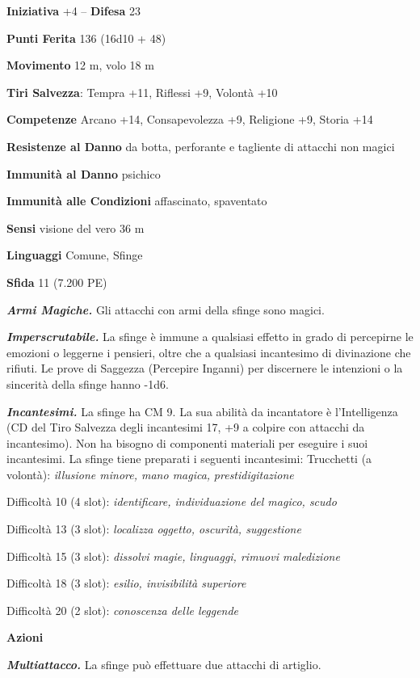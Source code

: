 \begin{multicols}{2}
\textbf{Iniziativa} +4 -- \textbf{Difesa} 23

\textbf{Punti Ferita} 136 (16d10 + 48)

\textbf{Movimento} 12 m, volo 18 m

\textbf{Tiri Salvezza}: Tempra +11, Riflessi +9, Volontà +10

\textbf{Competenze} Arcano +14, Consapevolezza +9, Religione +9, Storia +14

\textbf{Resistenze al Danno} da botta, perforante e tagliente di attacchi non magici

\textbf{Immunità al Danno} psichico

\textbf{Immunità alle Condizioni} affascinato, spaventato 

\textbf{Sensi} visione del vero 36 m

\textbf{Linguaggi} Comune, Sfinge

\textbf{Sfida} 11 (7.200 PE)

\emph{\textbf{Armi Magiche.}} Gli attacchi con armi della sfinge sono magici.

\emph{\textbf{Imperscrutabile.}} La sfinge è immune a qualsiasi effetto in grado di percepirne le emozioni o leggerne i pensieri, oltre che a qualsiasi incantesimo di divinazione che rifiuti. Le prove di Saggezza (Percepire Inganni) per discernere le intenzioni o la sincerità della sfinge hanno -1d6.

\emph{\textbf{Incantesimi.}} La sfinge ha CM 9. La sua abilità da incantatore è l'Intelligenza (CD del Tiro Salvezza degli incantesimi 17, +9 a colpire con attacchi da incantesimo). Non ha bisogno di componenti materiali per eseguire i suoi incantesimi. La sfinge tiene preparati i seguenti incantesimi: Trucchetti (a volontà): \emph{illusione minore, mano magica,} \emph{prestidigitazione}

Difficoltà 10 (4 slot): \emph{identificare, individuazione del magico, scudo}

Difficoltà 13 (3 slot): \emph{localizza oggetto, oscurità, suggestione} 

Difficoltà 15 (3 slot): \emph{dissolvi magie, linguaggi, rimuovi maledizione}

Difficoltà 18 (3 slot): \emph{esilio, invisibilità superiore}

Difficoltà 20 (2 slot): \emph{conoscenza delle leggende}

\textbf{Azioni}

\emph{\textbf{Multiattacco.}} La sfinge può effettuare due attacchi di artiglio.


\end{multicols}

